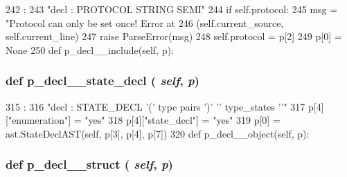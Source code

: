 \begin{DoxyCode}
242                                  :
243         "decl : PROTOCOL STRING SEMI"
244         if self.protocol:
245             msg = "Protocol can only be set once! Error at %
246                 (self.current_source, self.current_line)
247             raise ParseError(msg)
248         self.protocol = p[2]
249         p[0] = None
250 
    def p_decl__include(self, p):
\end{DoxyCode}
\hypertarget{classslicc_1_1parser_1_1SLICC_a18fd8cff26bef07652081e680b979709}{
\subsubsection[{p\_\-decl\_\-\_\-state\_\-decl}]{\setlength{\rightskip}{0pt plus 5cm}def p\_\-decl\_\-\_\-state\_\-decl ( {\em self}, \/   {\em p})}}
\label{classslicc_1_1parser_1_1SLICC_a18fd8cff26bef07652081e680b979709}



\begin{DoxyCode}
315                                    :
316         "decl : STATE_DECL '(' type pairs ')' '{' type_states   '}'"
317         p[4]["enumeration"] = "yes"
318         p[4]["state_decl"] = "yes"
319         p[0] = ast.StateDeclAST(self, p[3], p[4], p[7])
320 
    def p_decl__object(self, p):
\end{DoxyCode}
\hypertarget{classslicc_1_1parser_1_1SLICC_aad7ce4959341cf5a45d5c064bde196b6}{
\subsubsection[{p\_\-decl\_\-\_\-struct}]{\setlength{\rightskip}{0pt plus 5cm}def p\_\-decl\_\-\_\-struct ( {\em self}, \/   {\em p})}}
\label{classslicc_1_1parser_1_1SLICC_aad7ce4959341cf5a45d5c064bde196b6}



